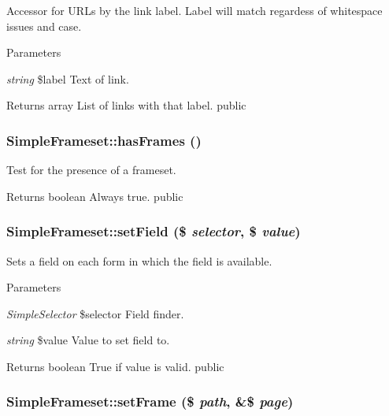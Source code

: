 Accessor for URLs by the link label. Label will match regardess of whitespace issues and case. 
\begin{DoxyParams}{Parameters}
\item[{\em string}]\$label Text of link. \end{DoxyParams}
\begin{DoxyReturn}{Returns}
array List of links with that label.  public 
\end{DoxyReturn}
\hypertarget{class_simple_frameset_ab83f9c4c135d16c4b9040d7fe0eb2c6f}{
\subsubsection[{hasFrames}]{\setlength{\rightskip}{0pt plus 5cm}SimpleFrameset::hasFrames ()}}
\label{class_simple_frameset_ab83f9c4c135d16c4b9040d7fe0eb2c6f}
Test for the presence of a frameset. \begin{DoxyReturn}{Returns}
boolean Always true.  public 
\end{DoxyReturn}
\hypertarget{class_simple_frameset_a6f8dec03f4f56a227b73e93cf005ed99}{
\subsubsection[{setField}]{\setlength{\rightskip}{0pt plus 5cm}SimpleFrameset::setField (\$ {\em selector}, \/  \$ {\em value})}}
\label{class_simple_frameset_a6f8dec03f4f56a227b73e93cf005ed99}
Sets a field on each form in which the field is available. 
\begin{DoxyParams}{Parameters}
\item[{\em SimpleSelector}]\$selector Field finder. \item[{\em string}]\$value Value to set field to. \end{DoxyParams}
\begin{DoxyReturn}{Returns}
boolean True if value is valid.  public 
\end{DoxyReturn}
\hypertarget{class_simple_frameset_a70729731514a1be863bef62e5689c029}{
\subsubsection[{setFrame}]{\setlength{\rightskip}{0pt plus 5cm}SimpleFrameset::setFrame (\$ {\em path}, \/  \&\$ {\em page})}}
